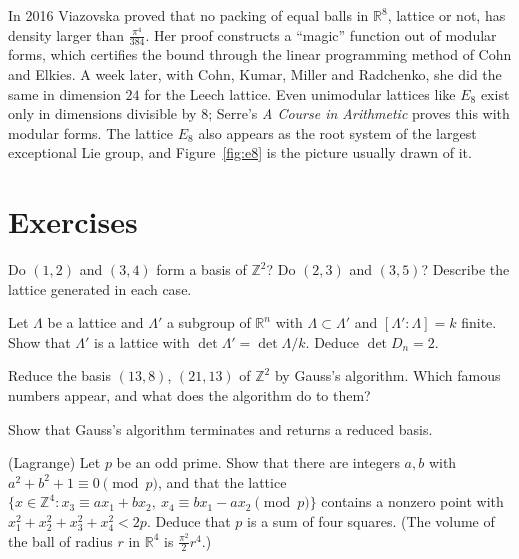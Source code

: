 \begin{remark}
In 2016 Viazovska proved that no packing of equal balls in $\mathbb R^8$, lattice or not, has density larger than $\frac{\pi^4}{384}$. Her proof constructs a
``magic'' function out of modular forms, which certifies the bound through the linear programming method of Cohn and Elkies. A week later, with Cohn,
Kumar, Miller and Radchenko, she did the same in dimension $24$ for the Leech lattice. Even unimodular lattices like $E_8$ exist only in dimensions divisible
by $8$; Serre's \emph{A Course in Arithmetic} proves this with modular forms. The lattice $E_8$ also appears as the root system of the largest exceptional Lie
group, and Figure~\ref{fig:e8} is the picture usually drawn of it.
\end{remark}

\section{Exercises}

\begin{exercise}[$\star$]\label{ex:basisZ2}
Do $(1,2)$ and $(3,4)$ form a basis of $\mathbb Z^2$? Do $(2,3)$ and $(3,5)$? Describe the lattice generated in each case.
\end{exercise}

\begin{exercise}[$\star$]\label{ex:index}
Let $\Lambda$ be a lattice and $\Lambda'$ a subgroup of $\mathbb R^n$ with $\Lambda\subset\Lambda'$ and $[\Lambda':\Lambda]=k$ finite. Show that $\Lambda'$ is a
lattice with $\det\Lambda'=\det\Lambda/k$. Deduce $\det D_n=2$.
\end{exercise}

\begin{exercise}[$\star$]\label{ex:gaussreduce}
Reduce the basis $(13,8)$, $(21,13)$ of $\mathbb Z^2$ by Gauss's algorithm. Which famous numbers appear, and what does the algorithm do to them?
\end{exercise}

\begin{exercise}[$\star\star$]\label{ex:gaussterminates}
Show that Gauss's algorithm terminates and returns a reduced basis.
\end{exercise}

\begin{exercise}[$\star\star$]\label{ex:foursquares}
(Lagrange) Let $p$ be an odd prime. Show that there are integers $a,b$ with $a^2+b^2+1\equiv0\pmod p$, and that the lattice
$\{x\in\mathbb Z^4:x_3\equiv ax_1+bx_2,\ x_4\equiv bx_1-ax_2\pmod p\}$ contains a nonzero point with $x_1^2+x_2^2+x_3^2+x_4^2<2p$. Deduce that $p$ is a sum
of four squares. (The volume of the ball of radius $r$ in $\mathbb R^4$ is $\frac{\pi^2}2r^4$.)
\end{exercise}

